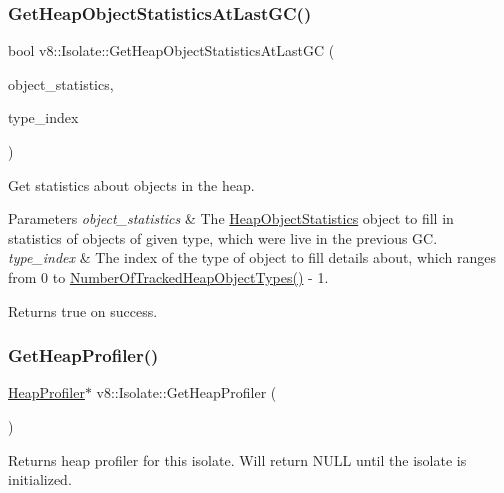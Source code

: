 \subsubsection{\texorpdfstring{Get\+Heap\+Object\+Statistics\+At\+Last\+G\+C()}{GetHeapObjectStatisticsAtLastGC()}}
{\footnotesize\ttfamily bool v8\+::\+Isolate\+::\+Get\+Heap\+Object\+Statistics\+At\+Last\+GC (\begin{DoxyParamCaption}\item[{\mbox{\hyperlink{classv8_1_1HeapObjectStatistics}{Heap\+Object\+Statistics}} $\ast$}]{object\+\_\+statistics,  }\item[{size\+\_\+t}]{type\+\_\+index }\end{DoxyParamCaption})}

Get statistics about objects in the heap.


\begin{DoxyParams}{Parameters}
{\em object\+\_\+statistics} & The \mbox{\hyperlink{classv8_1_1HeapObjectStatistics}{Heap\+Object\+Statistics}} object to fill in statistics of objects of given type, which were live in the previous GC. \\
\hline
{\em type\+\_\+index} & The index of the type of object to fill details about, which ranges from 0 to \mbox{\hyperlink{classv8_1_1Isolate_a170044cddf655345682cb3c9b4bd1788}{Number\+Of\+Tracked\+Heap\+Object\+Types()}} -\/ 1. \\
\hline
\end{DoxyParams}
\begin{DoxyReturn}{Returns}
true on success. 
\end{DoxyReturn}
\mbox{\label{classv8_1_1Isolate_a9c48259615e8370f6f0efd27cd7f99a6}} 
\subsubsection{\texorpdfstring{Get\+Heap\+Profiler()}{GetHeapProfiler()}}
{\footnotesize\ttfamily \mbox{\hyperlink{classv8_1_1HeapProfiler}{Heap\+Profiler}}$\ast$ v8\+::\+Isolate\+::\+Get\+Heap\+Profiler (\begin{DoxyParamCaption}{ }\end{DoxyParamCaption})}

Returns heap profiler for this isolate. Will return N\+U\+LL until the isolate is initialized. \mbox{\label{classv8_1_1Isolate_a28ab96294ee07064cbba01e969b62cbc}} 
